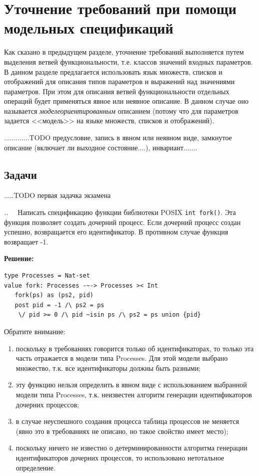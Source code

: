 \documentclass[14pt, twoside]{extreport}
\newcounter{problem_type}[chapter]
\newcounter{zadacha}[problem_type]
\newcommand{\z}{\vspace{0.5cm}\par\addtocounter{zadacha}{1}%
\textit{\arabic{chapter}.\arabic{problem_type}.\arabic{zadacha}}~~  }
\newcommand{\head}[1]{\vspace{1cm}\subsubsection*{#1}}
\newcommand{\zhead}[1]{\head{#1} \refstepcounter{problem_type}}
\begin{document}
\section{Уточнение требований при помощи модельных спецификаций}

Как сказано в предыдущем разделе, уточнение требований выполняется путем выделения ветвей функциональности, т.е. классов значений входных параметров. В данном разделе предлагается использовать язык множеств, списков и отображений для описания типов параметров и выражений над значениями параметров. При этом для описания ветвей функциональности отдельных операций будет применяться явное или неявное описание. В данном случае оно называется \emph{моделеориентированным} описанием (потому что для параметров задается <<модель>> на языке множеств, списков и отображений).


.............TODO предусловие, запись в явном или неявном виде, замкнутое описание (включает ли выходное состояние....), инвариант.......


\subsection*{Задачи}
.....TODO первая задачка экзамена


\z Написать спецификацию функции библиотеки POSIX \texttt{int fork()}. Эта функция позволяет создать дочерний процесс. Если дочерний процесс создан успешно, возвращается его идентификатор. В противном случае функция возвращает -1.

\textbf{Решение:}
\begin{lstlisting}
type Processes = Nat-set
value fork: Processes -~-> Processes >< Int
   fork(ps) as (ps2, pid)
   post pid = -1 /\ ps2 = ps
   	\/ pid >= 0 /\ pid ~isin ps /\ ps2 = ps union {pid}
\end{lstlisting}

Обратите внимание:
\begin{enumerate}
  \item поскольку в требованиях говорится только об идентификаторах, то только эта часть отражается в модели типа Processes. Для этой модели выбрано множество, т.к. все идентификаторы должны быть разными;
  \item эту функцию нельзя определить в явном виде с использованием выбранной модели типа Processes, т.к. неизвестен алгоритм генерации идентификаторов дочерних процессов;
  \item в случае неуспешного создания процесса таблица процессов не меняется (явно это в требованиях не описано, но такое свойство имеет место);
  \item поскольку ничего не известно о детерминированности алгоритма генерации идентификаторов дочерних процессов, то использовано нетотальное определение.
\end{enumerate}
\end{document}
